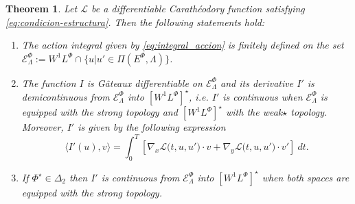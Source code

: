 \documentclass[twoside]{article}
\newtheorem{thm}{Theorem}[section]
\theoremstyle{remark}
\newcommand{\lphi}{L^{\Phi}}
\newcommand{\ephi}{E^{\Phi}}
\newcommand{\wphi}{W^{1}\lphi}
\newcommand{\domi}{\mathcal{E}^{\Phi}}
\begin{document}
\begin{thm}\label{teo:diferenciabilidad}
Let $\mathcal{L}$ be a differentiable Carath\'eodory function satisfying \eqref{eq:condicion-estructura}.
Then the following statements hold:
\begin{enumerate}
\item \label{it:T1item1} \label{A1} The action integral given by \eqref{eq:integral_accion}
is finitely defined on the set $\domi_{\Lambda}:=W^{1}\lphi\cap\{u|u'\in\Pi(\ephi,\Lambda)\}$.

\item\label{it:T1item3} The function  $I$ is G\^ateaux differentiable on $\domi_{\Lambda}$ and  its derivative $I'$ is demicontinuous from 
$\domi_{\Lambda}$  into $\left[\wphi \right]^{\star}$, i.e. $I'$ is continuous when $\domi_{\Lambda}$ is equipped with the strong topology and   $\left[\wphi \right]^{\star}$ with the weak${\star}$ topology. Moreover, $I'$ is given by the following expression
\begin{equation}\label{eq:DerAccion}
\langle  I'(u),v\rangle= \int_0^T \left[\nabla_x\mathcal{L}\big(t,u,u'\big)\cdot v
+ \nabla_y\mathcal{L}\big(t,u,u'\big)\cdot v'\right] \ dt.
\end{equation}

\item\label{it:T1item4}  If  $\Phi^{\star} \in \Delta_2$ then 
  $I'$ is continuous from $\domi_{\Lambda}$ into $\left[\wphi\right]^{\star}$ when both spaces are equipped with the strong topology.
\end{enumerate}
\end{thm}
\end{document}
